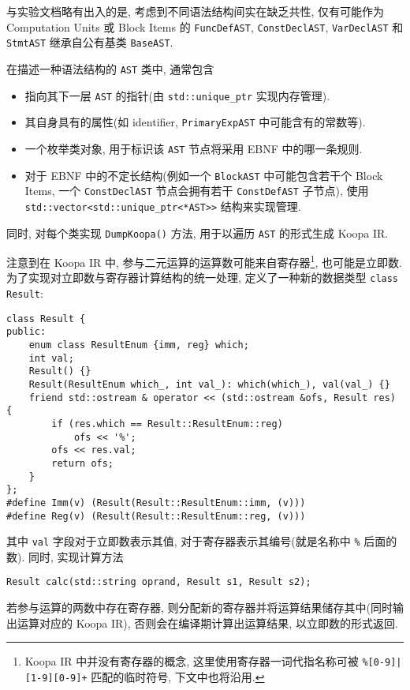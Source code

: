 \documentclass[8pt]{article}
\theoremstyle{compact}
\begin{document}
与实验文档略有出入的是, 考虑到不同语法结构间实在缺乏共性, 仅有可能作为 Computation Units 或 Block Items 的 \texttt{FuncDefAST}, \texttt{ConstDeclAST}, \texttt{VarDeclAST} 和 \texttt{StmtAST} 继承自公有基类 \texttt{BaseAST}.

在描述一种语法结构的 \texttt{AST} 类中, 通常包含
\begin{itemize}
    \item 指向其下一层 \texttt{AST} 的指针(由 \texttt{std::unique\_ptr} 实现内存管理).
    \item 其自身具有的属性(如 identifier, \texttt{PrimaryExpAST} 中可能含有的常数等).
    \item 一个枚举类对象, 用于标识该 \texttt{AST} 节点将采用 EBNF 中的哪一条规则.
    \item 对于 EBNF 中的不定长结构(例如一个 \texttt{BlockAST} 中可能包含若干个 Block Items, 一个 \texttt{ConstDeclAST} 节点会拥有若干 \texttt{ConstDefAST} 子节点), 使用 \texttt{std::vector<std::unique\_ptr<*AST>>} 结构来实现管理.
\end{itemize}

同时, 对每个类实现 \texttt{DumpKoopa()} 方法, 用于以遍历 \texttt{AST} 的形式生成 Koopa IR.

注意到在 Koopa IR 中, 参与二元运算的运算数可能来自寄存器\footnote[1]{Koopa IR 中并没有寄存器的概念, 这里使用寄存器一词代指名称可被 \texttt{\%[0-9]|[1-9][0-9]+} 匹配的临时符号, 下文中也将沿用.}, 也可能是立即数. 为了实现对立即数与寄存器计算结构的统一处理, 定义了一种新的数据类型 \texttt{class Result}: 
\begin{verbatim}
class Result {
public:
    enum class ResultEnum {imm, reg} which;
    int val;
    Result() {}
    Result(ResultEnum which_, int val_): which(which_), val(val_) {}
    friend std::ostream & operator << (std::ostream &ofs, Result res) {
        if (res.which == Result::ResultEnum::reg)
            ofs << '%';
        ofs << res.val;
        return ofs;
    }
};
#define Imm(v) (Result(Result::ResultEnum::imm, (v)))
#define Reg(v) (Result(Result::ResultEnum::reg, (v)))
\end{verbatim}

其中 \texttt{val} 字段对于立即数表示其值, 对于寄存器表示其编号(就是名称中 \texttt{\%} 后面的数). 同时, 实现计算方法 \begin{verbatim}
Result calc(std::string oprand, Result s1, Result s2);    
\end{verbatim}

若参与运算的两数中存在寄存器, 则分配新的寄存器并将运算结果储存其中(同时输出运算对应的 Koopa IR), 否则会在编译期计算出运算结果, 以立即数的形式返回.
\end{document}
